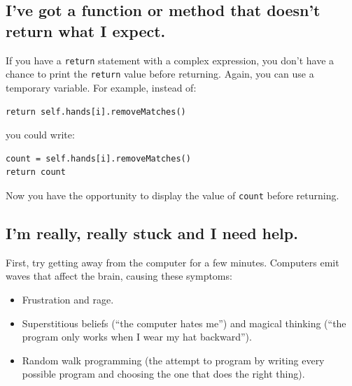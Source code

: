 \documentclass[10pt]{book}
\begin{document}
{\subsection{I've got a function or method that doesn't return what I
expect.}

If you have a {\tt return} statement with a complex expression,
you don't have a chance to print the {\tt return} value before
returning.  Again, you can use a temporary variable.  For
example, instead of:

\beforeverb
\begin{verbatim}
return self.hands[i].removeMatches()
\end{verbatim}
\afterverb
%
you could write:

\beforeverb
\begin{verbatim}
count = self.hands[i].removeMatches()
return count
\end{verbatim}
\afterverb
%
Now you have the opportunity to display the value of
{\tt count} before returning.


\subsection{I'm really, really stuck and I need help.}

First, try getting away from the computer for a few minutes.
Computers emit waves that affect the brain, causing these
symptoms:

\begin{itemize}

\item Frustration and rage.


\item Superstitious beliefs (``the computer hates me'') and
magical thinking (``the program only works when I wear my
hat backward'').


\item Random walk programming (the attempt to program by writing
every possible program and choosing the one that does the right
thing).


\end{itemize}

}
\end{document}
